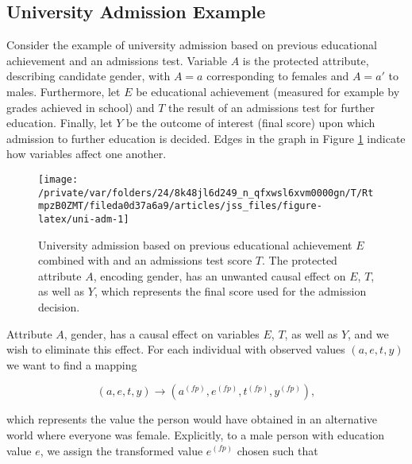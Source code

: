\documentclass[
  nojss]{jss}
\begin{document}
\hypertarget{university-admission-example}{%
\subsection{University Admission
Example}\label{university-admission-example}}

Consider the example of university admission based on previous
educational achievement and an admissions test. Variable \(A\) is the
protected attribute, describing candidate gender, with \(A = a\)
corresponding to females and \(A = a'\) to males. Furthermore, let \(E\)
be educational achievement (measured for example by grades achieved in
school) and \(T\) the result of an admissions test for further
education. Finally, let \(Y\) be the outcome of interest (final score)
upon which admission to further education is decided. Edges in the graph
in Figure \ref{fig:uni-adm} indicate how variables affect one another.

\begin{CodeChunk}
\begin{figure}

{\centering \texttt{[image: /private/var/folders/24/8k48jl6d249\_n\_qfxwsl6xvm0000gn/T/RtmpzB0ZMT/fileda0d37a6a9/articles/jss\_files/figure-latex/uni-adm-1]} 

}

\caption[University admission based on previous educational achievement $E$ combined with and an admissions test score $T$]{University admission based on previous educational achievement $E$ combined with and an admissions test score $T$. The protected attribute $A$, encoding gender, has an unwanted causal effect on  $E$, $T$, as well as $Y$, which represents the final score used for the admission decision.}\label{fig:uni-adm}
\end{figure}
\end{CodeChunk}

Attribute \(A\), gender, has a causal effect on variables \(E\), \(T\),
as well as \(Y\), and we wish to eliminate this effect. For each
individual with observed values \((a, e, t, y)\) we want to find a
mapping

\[(a, e, t, y) \longrightarrow  ( {a}^{(fp)},  {e}^{(fp)},  {t}^{(fp)},  {y}^{(fp)}),\]

which represents the value the person would have obtained in an
alternative world where everyone was female. Explicitly, to a male
person with education value \(e\), we assign the transformed value
\( {e}^{(fp)}\) chosen such that
\end{document}
